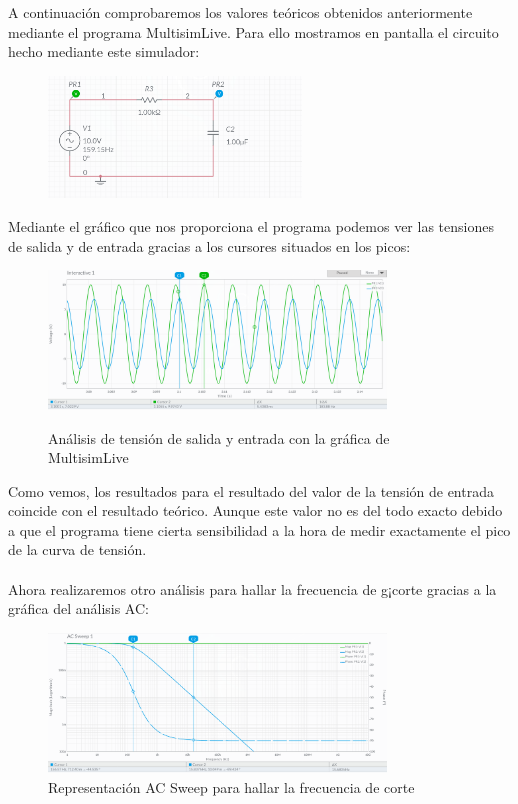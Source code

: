 \documentclass[11pt,letterpaper]{article}
\begin{document}
A continuación comprobaremos los valores teóricos obtenidos anteriormente mediante el programa MultisimLive. Para ello mostramos en pantalla el circuito hecho mediante este simulador:
\begin{figure}[h]
	\centering
	\includegraphics[width=0.6\textwidth]{imagen/circuitoRL_R.png}
\end{figure}
Mediante el gráfico que nos proporciona el programa podemos ver las tensiones de salida y de entrada gracias a los cursores situados en los picos:
\begin{figure}[H]
	\centering
	\includegraphics[width=0.8\textwidth]{imagen/analisispotenciales.png}
	\label{fig:analisispotencial-png}
	\caption{Análisis de tensión de salida y entrada con la gráfica de MultisimLive}
\end{figure}
Como vemos, los resultados para el resultado del valor de la tensión de entrada coincide con el resultado teórico. Aunque este valor no es del todo exacto debido a que el programa tiene cierta sensibilidad a la hora de medir exactamente el pico de la curva de tensión.\\
\\
Ahora realizaremos otro análisis para hallar la frecuencia de g¡corte gracias a la gráfica del análisis AC:
\begin{figure}[H]
	\centering
	\includegraphics[width=0.8\textwidth]{imagen/analisisAC.png}
	\caption{Representación AC Sweep para hallar la frecuencia de corte}
	\label{fig:imagen-analisisAC-png}
\end{figure}
\end{document}
